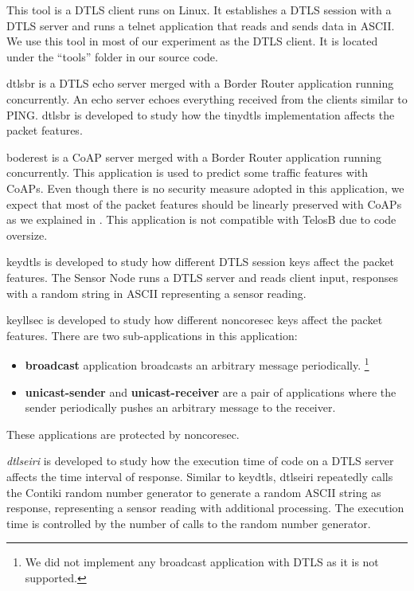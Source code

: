 \begin{description}[style=nextline]

	\item[{dtls-telnet}]
	This tool is a DTLS client runs on Linux. It establishes a DTLS session with a DTLS server and runs a telnet application that reads and sends data in ASCII. We use this tool in most of our experiment as the DTLS client. It is located under the ``tools'' folder in our source code.
	
	\item[{dtlsbr}]
	{dtlsbr} is a DTLS echo server merged with a Border Router application running concurrently. An echo server echoes everything received from the clients similar to PING. {dtlsbr} is developed to study how the tinydtls implementation affects the packet features.
	
	\item[{borderest}]
	{boderest} is a CoAP server merged with a Border Router application running concurrently. This application is used to predict some traffic features with CoAPs. Even though there is no security measure adopted in this application, we expect that most of the packet features should be linearly preserved with CoAPs as we explained in . This application is not compatible with TelosB due to code oversize.
	
	\item[{keydtls}]
	{keydtls} is developed to study how different DTLS session keys affect the packet features. The Sensor Node runs a DTLS server and reads client input, responses with a random string in ASCII representing a sensor reading.
	
	\item[{keyllsec}]
	{keyllsec} is developed to study how different noncoresec keys affect the packet features. There are two sub-applications in this application:
	\begin{itemize}
		\item \textbf{broadcast} application broadcasts an arbitrary message periodically. \footnote{We did not implement any broadcast application with DTLS as it is not supported.}
		\item \textbf{unicast-sender} and \textbf{unicast-receiver} are a pair of applications where the sender periodically pushes an arbitrary message to the receiver.
	\end{itemize}
	These applications are protected by noncoresec.

	\item[{dtlseiri}]
	\textit{dtlseiri} is developed to study how the execution time of code on a DTLS server affects the time interval of response. Similar to {keydtls}, {dtlseiri} repeatedly calls the Contiki random number generator to generate a random ASCII string as response, representing a sensor reading with additional processing. The execution time is controlled by the number of calls to the random number generator. 


\end{description}
